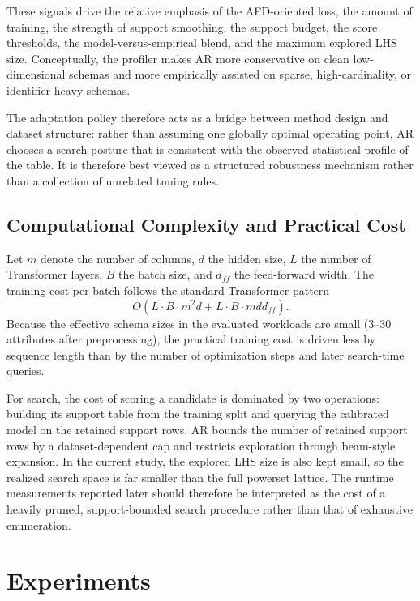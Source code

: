 \documentclass[conference]{IEEEtran}
\begin{document}
These signals drive the relative emphasis of the AFD-oriented loss, the amount of training, the strength of support smoothing, the support budget, the score thresholds, the model-versus-empirical blend, and the maximum explored LHS size. Conceptually, the profiler makes AR more conservative on clean low-dimensional schemas and more empirically assisted on sparse, high-cardinality, or identifier-heavy schemas.

The adaptation policy therefore acts as a bridge between method design and dataset structure: rather than assuming one globally optimal operating point, AR chooses a search posture that is consistent with the observed statistical profile of the table. It is therefore best viewed as a structured robustness mechanism rather than a collection of unrelated tuning rules.

\subsection{Computational Complexity and Practical Cost}\label{sec:complexity}

Let $m$ denote the number of columns, $d$ the hidden size, $L$ the number of Transformer layers, $B$ the batch size, and $d_{ff}$ the feed-forward width. The training cost per batch follows the standard Transformer pattern
\begin{equation}
    O\!\left(L \cdot B \cdot m^2 d + L \cdot B \cdot m d d_{ff}\right).
\end{equation}
Because the effective schema sizes in the evaluated workloads are small (3--30 attributes after preprocessing), the practical training cost is driven less by sequence length than by the number of optimization steps and later search-time queries.

For search, the cost of scoring a candidate is dominated by two operations: building its support table from the training split and querying the calibrated model on the retained support rows. AR bounds the number of retained support rows by a dataset-dependent cap and restricts exploration through beam-style expansion. In the current study, the explored LHS size is also kept small, so the realized search space is far smaller than the full powerset lattice. The runtime measurements reported later should therefore be interpreted as the cost of a heavily pruned, support-bounded search procedure rather than that of exhaustive enumeration.

\section{Experiments}\label{sec:exp}
\end{document}
